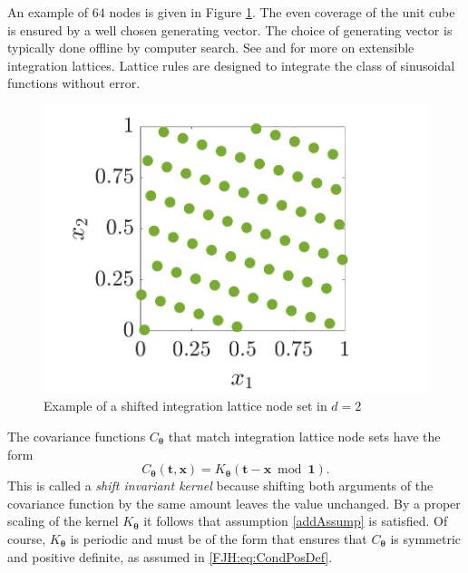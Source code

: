 \documentclass{iitthesis}          %
\newcommand{\bm}[1]{\boldsymbol{#1}}
\newcommand{\vtheta}{{\bm{\theta}}}
\newcommand{\vt}{\bm{t}}
\newcommand{\vx}{\bm{x}}
\newcommand{\vone}{\bm{1}}
\begin{document}
An example of $64$ nodes is given in Figure  \ref{latticefig}.  The even coverage of the unit cube is ensured by a well chosen generating vector.  The choice of generating vector is typically done offline by computer search.  See \cite{DicEtal14a} and \cite{HicNie03a} for more on extensible integration lattices. Lattice rules are designed to integrate the class of sinusoidal functions without error.
\begin{figure}[htp]
	\centering
	\includegraphics[width=0.8\linewidth]{ShiftedLatticePoints}
	\caption{Example of a shifted integration lattice node set  in $d=2$ \label{latticefig} }
\end{figure}

\label{sec:shift_invar_kern}

The covariance functions $C_{\vtheta}$ that match integration lattice node sets have the form
\begin{equation} \label{eq:shInv}
C_{\vtheta}(\vt,\vx) = K_{\vtheta}(\vt - \vx \bmod \vone).
\end{equation}
This is called a \emph{shift invariant kernel} because shifting both arguments of the covariance function by the same amount leaves the value unchanged.   By a proper scaling of the kernel $K_{\vtheta}$ it follows that assumption \eqref{addAssump} is satisfied. Of course, $K_{\vtheta}$ is periodic and must be of the form that ensures that $C_{\vtheta}$ is symmetric and positive definite, as assumed in \eqref{FJH:eq:CondPosDef}. 
\end{document}
